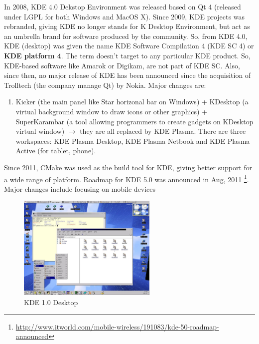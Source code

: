 In 2008, KDE 4.0 Dekstop Environment was released based on Qt 4 (released under
LGPL for both Windows and MacOS X).  Since 2009, KDE projects was rebranded,
giving KDE no longer stands for K Desktop Environment, but act as an umbrella
brand for software produced by the community. So, from KDE 4.0, KDE (desktop)
was given the name KDE Software Compilation 4 (KDE SC 4) or {\bf KDE platform
4}. The term doesn't target to any particular KDE product.
So, KDE-based software like Amarok or Digikam, are not part of KDE SC. Also,
since then, no major release of KDE has been announced since the acquisition of
Trolltech (the company manage Qt) by Nokia. Major changes are:
\begin{enumerate}
  \item Kicker (the main panel like Star horizonal bar on Windows) + KDesktop
  (a virtual background window to draw icons or other graphics) +
  SuperKarambar (a tool allowing programmers to create gadgets on KDesktop
  virtual window) $\rightarrow$ they are all replaced by KDE Plasma. There are
  three workspaces: KDE Plasma Desktop, KDE Plasma Netbook and KDE Plasma
  Active (for tablet, phone). 
  
   
\end{enumerate}


Since 2011, CMake was used as the build tool for KDE, giving better support for
a wide range of platform. Roadmap for KDE 5.0 was announced in Aug, 2011
\footnote{\url{http://www.itworld.com/mobile-wireless/191083/kde-50-roadmap-announced}}.
Major changes include focusing on mobile devices


\begin{figure}[hbt]
  \centerline{\includegraphics[height=5cm,
    angle=0]{./images/kde1.eps}}
\caption{KDE 1.0 Desktop}
\label{fig:kde1}
\end{figure}

